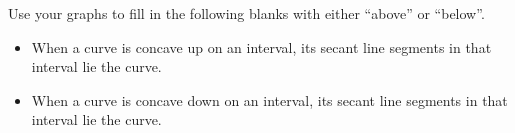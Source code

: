 \documentclass{article}
\begin{document}
\begin{enumerate}
  \begin{solution}
    \begin{center}
    \end{center}
  \end{solution}

  \begin{problem}
    Use your graphs to fill in the following blanks with either ``above'' or ``below''.
  \end{problem}

  \begin{itemize}

  \item When a curve is concave up on an interval, its secant line segments in that interval lie  the curve.

  \item When a curve is concave down on an interval, its secant line segments in that interval lie  the curve.

  \end{itemize}


\end{enumerate}
\end{document}

